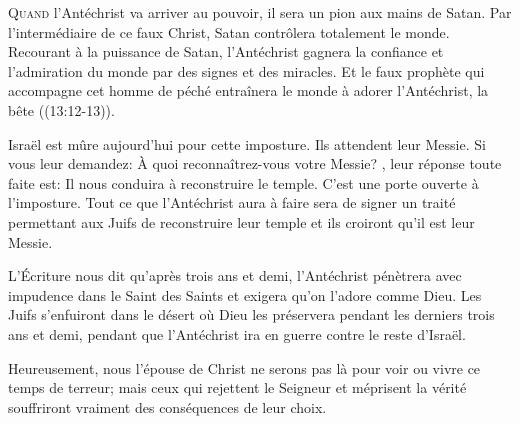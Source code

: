 



\lettrine{Q}{uand} l'Antéchrist va arriver au pouvoir, 
 il sera un pion aux mains de Satan. Par l'intermédiaire de ce faux Christ,
 Satan contrôlera totalement le monde. Recourant à la puissance de Satan,
 l'Antéchrist gagnera la confiance et l'admiration du monde
 par des signes et des miracles.
 Et le faux prophète qui accompagne cet homme de péché entraînera le monde
 à adorer l'Antéchrist, la \Og bête \Fg{} ((13:12-13)). 



Israël est mûre aujourd'hui pour cette imposture. Ils attendent leur Messie.
 Si vous leur demandez: 
 \Og À quoi reconnaîtrez-vous votre Messie? \Fg{},
 leur réponse toute faite est: 
 \Og Il nous conduira à reconstruire le temple. \Fg{}
 C'est une porte ouverte à l'imposture. Tout ce que l'Antéchrist
 aura à faire sera de signer un traité permettant aux Juifs
 de reconstruire leur temple \ocadr et ils croiront qu'il est leur Messie. 

L'Écriture nous dit qu'après trois ans et demi,
 l'Antéchrist pénètrera avec impudence dans le Saint des Saints
 et exigera qu'on l'adore comme Dieu. Les Juifs s'enfuiront dans le désert
 où Dieu les préservera pendant les derniers trois ans et demi,
 pendant que l'Antéchrist ira en guerre contre le reste d'Israël. 

Heureusement, nous \ocadr l'épouse de Christ \fcadr{} ne serons pas là
 pour voir ou vivre ce temps de terreur; mais ceux qui rejettent le Seigneur
 et méprisent
 la vérité souffriront vraiment des conséquences de leur choix. 

\dvrule



